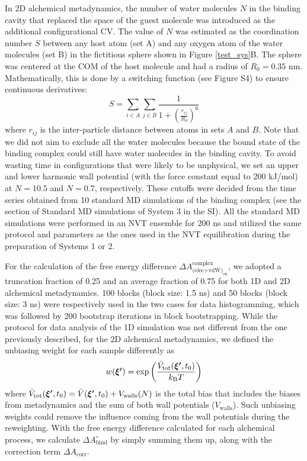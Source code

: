 \documentclass[journal=jacsat,manuscript=article]{achemso}
\newcommand{\bfv}[1]{{\mbox{\boldmath{$#1$}}}}
\begin{document}
In 2D alchemical metadynamics, the number of water molecules $N$ in the binding cavity that replaced the space of the guest molecule was introduced as the additional configurational CV. The value of $N$ was estimated as the coordination number $S$ between any host atom (set A) and any oxygen atom of the water molecules (set B) in the fictitious sphere shown in Figure \ref{test_sys}B. The sphere was centered at the COM of the host molecule and had a radius of $R_0=0.35$ nm. Mathematically, this is done by a switching function (see Figure S4) to ensure continuous derivatives:
\begin{equation}
    S = \sum_{i\in A}\sum_{j\in B}\frac{1}{1+\left(\frac{r_{ij}}{R_0}\right)^{6}}
\end{equation} where $r_{ij}$ is the inter-particle distance between atoms in sets $A$ and $B$. Note that we did not aim to exclude all the water molecules because the bound state of the binding complex could still have water molecules in the binding cavity. To avoid wasting time in configurations that were likely to be unphysical, we set an upper and lower harmonic wall potential (with the force constant equal to 200 kJ/mol) at $N=10.5$ and $N=0.7$, respectively. These cutoffs were decided from the time series obtained from 10 standard MD simulations of the binding complex (see the section of Standard MD simulations of System 3 in the SI). All the standard MD simulations were performed in an NVT ensemble for 200 ns and utilized the same protocol and parameters as the ones used in the NVT equilibration during the preparation of Systems 1 or 2. 

For the calculation of the free energy difference $\Delta A^{\text{complex}}_{\text{(elec+vdW)}_{\text{on}}}$, we adopted a truncation fraction of 0.25 and an average fraction of 0.75 for both 1D and 2D alchemical metadynamics. 100 blocks (block size: 1.5 ns) and 50 blocks (block size: 3 ns) were respectively used in the two cases for data histogramming, which was followed by 200 bootstrap iterations in block bootstrapping. While the protocol for data analysis of the 1D simulation was not different from the one previously described, for the 2D alchemical metadynamics, we defined the unbiasing weight for each sample differently as 
\begin{equation}
    w(\bfv{\xi'}) = \exp\left(\frac{\bar{V}_{\text{tot}}(\bfv{\xi'}, t_0)}{k_{\text{B}}T}\right)
\end{equation} where $\bar{V}_{\text{tot}}(\bfv{\xi'}, t_0)=\bar{V}(\bfv{\xi'}, t_0) + V_{\text{walls}}(N)$ is the total bias that includes the biases from metadynamics and the sum of both wall potentials ($V_{\text{walls}}$). Such unbiasing weights could remove the influence coming from the wall potentials during the reweighting. With the free energy difference calculated for each alchemical process, we calculate $\Delta A^{\circ}_{\text{bind}}$ by simply summing them up, along with the correction term $\Delta A_{\text{corr}}$. 
\end{document}
